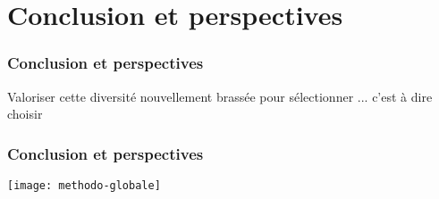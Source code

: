 \section{Conclusion et perspectives}
\begin{frame}\tableofcontents[currentsection,currentsubsection,subsectionstyle=show/show/hide]\end{frame}


\begin{frame}
\frametitle{Conclusion et perspectives}

\begin{block}{}
\begin{center}
\Huge
Valoriser cette diversité nouvellement brassée pour sélectionner ... c'est à dire choisir
\end{center}
\end{block}

\end{frame}


\begin{frame}
\frametitle{Conclusion et perspectives}

\begin{center}
\texttt{[image: methodo-globale]}
\end{center}

\end{frame}



